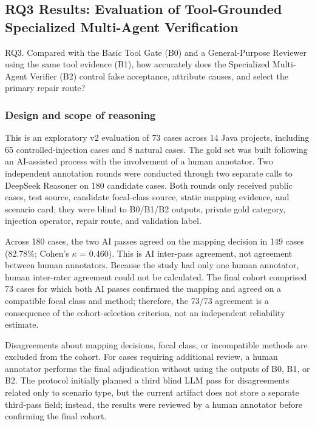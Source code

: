 \documentclass[pdflatex,sn-basic,Numbered,iicol]{sn-jnl}
\begin{document}
\subsection{RQ3 Results: Evaluation of Tool-Grounded Specialized Multi-Agent Verification}\label{subsec:rq3}

RQ3. Compared with the Basic Tool Gate (B0) and a General-Purpose Reviewer using the same tool evidence (B1), how accurately does the Specialized Multi-Agent Verifier (B2) control false acceptance, attribute causes, and select the primary repair route?

\subsubsection{Design and scope of reasoning}\label{subsubsec:rq3-design}

This is an exploratory v2 evaluation of 73 cases across 14 Java projects, including 65 controlled-injection cases and 8 natural cases. The gold set was built following an AI-assisted process with the involvement of a human annotator. Two independent annotation rounds were conducted through two separate calls to DeepSeek Reasoner on 180 candidate cases. Both rounds only received public cases, test source, candidate focal-class source, static mapping evidence, and scenario card; they were blind to B0/B1/B2 outputs, private gold category, injection operator, repair route, and validation label.

Across 180 cases, the two AI passes agreed on the mapping decision in 149 cases (82.78\%; Cohen's \ensuremath{\kappa} = 0.460). This is AI inter-pass agreement, not agreement between human annotators. Because the study had only one human annotator, human inter-rater agreement could not be calculated. The final cohort comprised 73 cases for which both AI passes confirmed the mapping and agreed on a compatible focal class and method; therefore, the 73/73 agreement is a consequence of the cohort-selection criterion, not an independent reliability estimate.

Disagreements about mapping decisions, focal class, or incompatible methods are excluded from the cohort. For cases requiring additional review, a human annotator performs the final adjudication without using the outputs of B0, B1, or B2. The protocol initially planned a third blind LLM pass for disagreements related only to scenario type, but the current artifact does not store a separate third-pass field; instead, the results were reviewed by a human annotator before confirming the final cohort.
\end{document}
